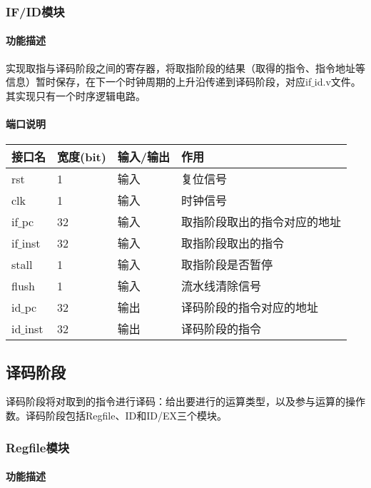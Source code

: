 \subsubsection{IF/ID模块}
\paragraph{功能描述}
\quad

\quad

实现取指与译码阶段之间的寄存器，将取指阶段的结果（取得的指令、指令地址等信息）暂时保存，在下一个时钟周期的上升沿传递到译码阶段，对应if$\_$id.v文件。其实现只有一个时序逻辑电路。
\paragraph{端口说明}
\quad

\quad
	\begin{longtable}{|l|l|l|l|}
		\hline
		接口名 & 宽度(bit) & 输入/输出 & 作用 \\
		\hline
		rst & 1 & 输入 & 复位信号 \\
		\hline
		clk & 1 & 输入 & 时钟信号 \\
		\hline
		if$\_$pc & 32 & 输入 & 取指阶段取出的指令对应的地址 \\
		\hline
		if$\_$inst & 32 & 输入 & 取指阶段取出的指令 \\
		\hline
		stall & 1 & 输入 & 取指阶段是否暂停 \\
		\hline
		flush & 1 & 输入 & 流水线清除信号 \\
		\hline
		id$\_$pc & 32 & 输出 & 译码阶段的指令对应的地址 \\
		\hline
		id$\_$inst & 32 & 输出 & 译码阶段的指令 \\
		\hline
	\end{longtable}
\subsection{译码阶段}
译码阶段将对取到的指令进行译码：给出要进行的运算类型，以及参与运算的操作数。译码阶段包括Regfile、ID和ID/EX三个模块。
\subsubsection{Regfile模块}
\paragraph{功能描述}
\quad

